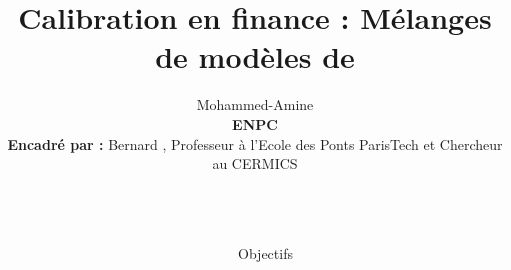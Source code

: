 \documentclass[final]{beamer}
\title{Calibration en finance : Mélanges de modèles de \bsc{Black-Scholes}} %
\author{\bsc{Kheldouni} Mohammed-Amine
\\\vspace{1cm} \textbf{ENPC}
\\\vspace{1cm} \textbf{Encadr\'e par :}
Bernard \bsc{Lapeyre}, Professeur à l'Ecole des Ponts ParisTech et Chercheur au CERMICS} %
\institute{\vspace{-2cm}}
\newlength{\sepwid}
\newlength{\onecolwid}
\begin{document}

\setlength{\belowcaptionskip}{2ex} %
\setlength\belowdisplayshortskip{2ex} %

\begin{frame}[t] %

\begin{columns}[t] %

\begin{column}{\sepwid}\end{column} %

\begin{column}{\onecolwid} %


\begin{alertblock}{Objectifs}


\end{alertblock}




\end{column}
\end{columns}
\end{frame}
\end{document}
